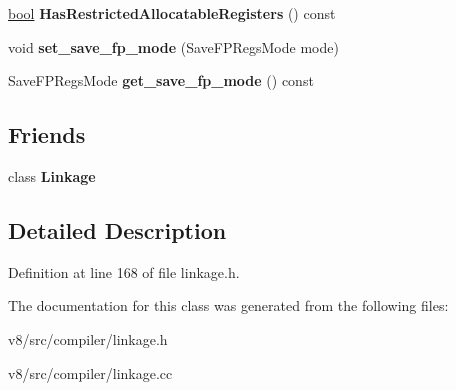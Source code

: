 \begin{DoxyCompactItemize}
\item 
\mbox{\label{classv8_1_1internal_1_1compiler_1_1CallDescriptor_a45c44dfd1c0dacbcf97454c6e6d4bd9b}} 
\mbox{\hyperlink{classbool}{bool}} {\bfseries Has\+Restricted\+Allocatable\+Registers} () const
\item 
\mbox{\label{classv8_1_1internal_1_1compiler_1_1CallDescriptor_a69394fc900c97247ecb571e34aac5de7}} 
void {\bfseries set\+\_\+save\+\_\+fp\+\_\+mode} (Save\+F\+P\+Regs\+Mode mode)
\item 
\mbox{\label{classv8_1_1internal_1_1compiler_1_1CallDescriptor_a03f08dd9b73cd758606d9611c98cf1ce}} 
Save\+F\+P\+Regs\+Mode {\bfseries get\+\_\+save\+\_\+fp\+\_\+mode} () const
\end{DoxyCompactItemize}
\subsection*{Friends}
\begin{DoxyCompactItemize}
\item 
\mbox{\label{classv8_1_1internal_1_1compiler_1_1CallDescriptor_a630e1c2c772000cc88aada0fb04d7f76}} 
class {\bfseries Linkage}
\end{DoxyCompactItemize}


\subsection{Detailed Description}


Definition at line 168 of file linkage.\+h.



The documentation for this class was generated from the following files\+:\begin{DoxyCompactItemize}
\item 
v8/src/compiler/linkage.\+h\item 
v8/src/compiler/linkage.\+cc\end{DoxyCompactItemize}
